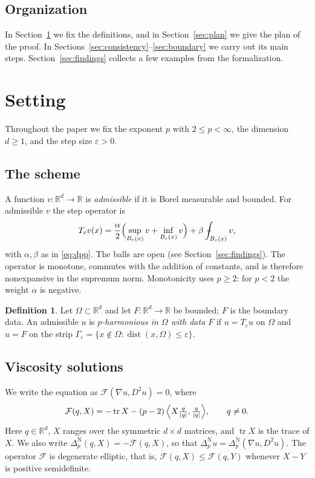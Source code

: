 \documentclass[11pt,reqno]{amsart}
\newcommand{\R}{\mathbb{R}}
\newcommand{\eps}{\varepsilon}
\newcommand{\pnlap}{\Delta_p^{\mathrm{N}}}       %
\newcommand{\Op}{T_{\eps}}                       %
\newcommand{\Fop}{\mathcal{F}}                   %
\DeclarePairedDelimiter{\abs}{\lvert}{\rvert}
\theoremstyle{plain}
\theoremstyle{definition}
\newtheorem{definition}[theorem]{Definition}
\theoremstyle{remark}
\begin{document}
\subsection*{Organization}
In Section~\ref{sec:setting} we fix the definitions, and in
Section~\ref{sec:plan} we give the plan of the proof. In
Sections~\ref{sec:consistency}--\ref{sec:boundary} we carry out its main
steps. Section~\ref{sec:findings} collects a few examples from the
formalization.

\section{Setting}\label{sec:setting}

Throughout the paper we fix the exponent $p$ with $2 \le p < \infty$, the
dimension $d \ge 1$, and the step size $\eps > 0$.

\subsection{The scheme}
A function $v \colon \R^d \to \R$ is \emph{admissible} if it is Borel
measurable and bounded. For admissible $v$ the step operator is
\begin{equation}\label{eq:op}
  \Op v(x) = \frac{\alpha}{2}\Bigl(\sup_{B_\eps(x)} v + \inf_{B_\eps(x)} v\Bigr)
    + \beta \fint_{B_\eps(x)} v ,
\end{equation}
with $\alpha,\beta$ as in \eqref{eq:dpp}. The balls are open
(see Section~\ref{sec:findings}). The operator is monotone, commutes with the
addition of constants, and is therefore nonexpansive in the supremum norm.
Monotonicity uses $p \ge 2$: for $p < 2$ the weight $\alpha$ is negative.

\begin{definition}\label{def:pharm}
Let $\Omega \subset \R^d$ and let $F \colon \R^d \to \R$ be bounded; $F$ is
the boundary data. An admissible $u$ is \emph{$p$-harmonious in $\Omega$ with
data $F$} if $u = \Op u$ on $\Omega$ and $u = F$ on the strip
$\Gamma_\eps = \{x \notin \Omega : \operatorname{dist}(x,\Omega) \le \eps\}$.
\end{definition}

\subsection{Viscosity solutions}
We write the equation as $\Fop(\nabla u, D^2u) = 0$, where
\[
  \Fop(q, X) = -\operatorname{tr} X - (p-2)\,
    \Bigl\langle X\tfrac{q}{\abs q}, \tfrac{q}{\abs q}\Bigr\rangle ,
  \qquad q \ne 0 .
\]
Here $q \in \R^d$, $X$ ranges over the symmetric $d \times d$ matrices, and
$\operatorname{tr} X$ is the trace of $X$. We also write
$\pnlap(q, X) = -\Fop(q, X)$, so that $\pnlap u = \pnlap(\nabla u, D^2u)$.
The operator $\Fop$ is degenerate elliptic, that is,
$\Fop(q, X) \le \Fop(q, Y)$ whenever $X - Y$ is positive semidefinite.
\end{document}
